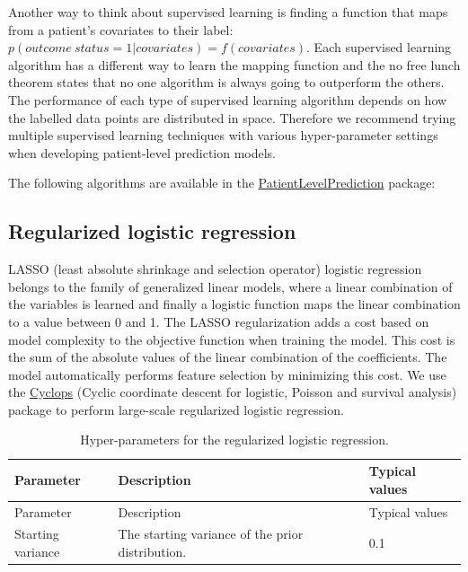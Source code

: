 \documentclass[11pt]{book}
\theoremstyle{definition}
\theoremstyle{definition}
\theoremstyle{definition}
\theoremstyle{remark}
\begin{document}
Another way to think about supervised learning is finding a function that maps from a patient's covariates to their label: \(p(outcome\ status = 1|covariates) = f(covariates)\). Each supervised learning algorithm has a different way to learn the mapping function and the no free lunch theorem states that no one algorithm is always going to outperform the others. The performance of each type of supervised learning algorithm depends on how the labelled data points are distributed in space. Therefore we recommend trying multiple supervised learning techniques with various hyper-parameter settings when developing patient-level prediction models.

The following algorithms are available in the \href{https://ohdsi.github.io/PatientLevelPrediction/}{PatientLevelPrediction} package:

\hypertarget{regularized-logistic-regression}{%
\subsection{Regularized logistic regression}\label{regularized-logistic-regression}}

LASSO (least absolute shrinkage and selection operator) logistic regression belongs to the family of generalized linear models, where a linear combination of the variables is learned and finally a logistic function maps the linear combination to a value between 0 and 1. The LASSO regularization adds a cost based on model complexity to the objective function when training the model. This cost is the sum of the absolute values of the linear combination of the coefficients. The model automatically performs feature selection by minimizing this cost. We use the \href{https://ohdsi.github.io/Cyclops/}{Cyclops} (Cyclic coordinate descent for logistic, Poisson and survival analysis) package to perform large-scale regularized logistic regression.    

\begin{longtable}[]{@{}lll@{}}
\caption{\label{tab:lassoParameters} Hyper-parameters for the regularized logistic regression.}\tabularnewline
\toprule
Parameter & Description & Typical values\tabularnewline
\midrule
\endfirsthead
\toprule
Parameter & Description & Typical values\tabularnewline
\midrule
\endhead
Starting variance & The starting variance of the prior distribution. & 0.1\tabularnewline
\bottomrule
\end{longtable}
\end{document}
